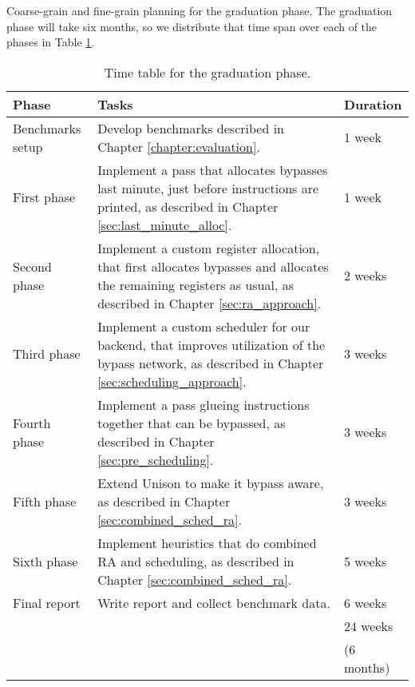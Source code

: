 Coarse-grain and fine-grain planning for the graduation phase. The graduation phase will take six months, so we distribute that time span over each of the phases in Table \ref{table:planning}.

\begin{table}[h]
\caption{Time table for the graduation phase.}
\begin{center}
\begin{tabular}{@{}p{}p{}p{}@{}}
\toprule
\textbf{Phase} 		& \textbf{Tasks} & \textbf{Duration} \\ \hline
Benchmarks setup 	& Develop benchmarks described in Chapter \ref{chapter:evaluation}.			& 1 week \\
First phase		& Implement a pass that allocates bypasses last minute, just before instructions are printed, as described in Chapter \ref{sec:last_minute_alloc}.		& 1 week \\
Second phase	& Implement a custom register allocation, that first allocates bypasses and allocates the remaining registers as usual, as described in Chapter \ref{sec:ra_approach}.	& 2 weeks \\
Third phase		& Implement a custom scheduler for our backend, that improves utilization of the bypass network, as described in Chapter \ref{sec:scheduling_approach}. & 3 weeks \\
Fourth phase 	& Implement a pass glueing instructions together that can be bypassed, as described in Chapter \ref{sec:pre_scheduling}. & 3 weeks\\
Fifth phase 	& Extend Unison to make it bypass aware, as described in Chapter \ref{sec:combined_sched_ra}. & 3 weeks \\
Sixth phase		& Implement heuristics that do combined RA and scheduling, as described in Chapter \ref{sec:combined_sched_ra}. & 5 weeks \\
Final report		& Write report and collect benchmark data. 	& 6 weeks \\
\hline%
\multicolumn{2}{c}{ \multirow{2}{*}{Total time}} 				& 24 weeks\\
	&											& (6 months)\\
\bottomrule
\end{tabular}
\end{center}
\label{table:planning}
\end{table}%
